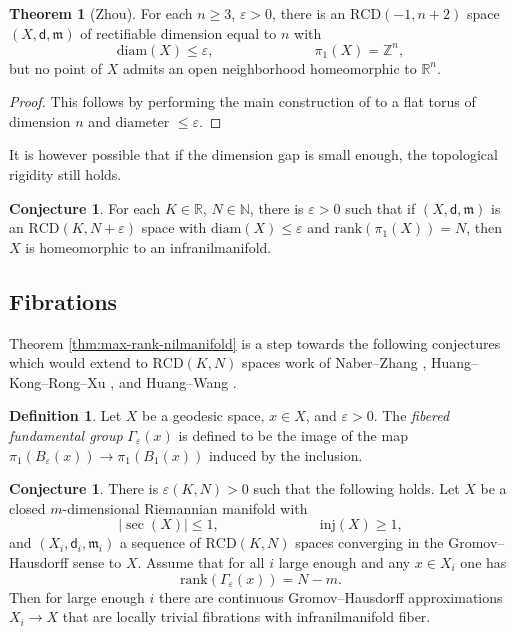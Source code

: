 \documentclass[12pt]{amsart}
\theoremstyle{definition}
\def\fnum{equation}
\newtheorem{theorem}[\fnum]{Theorem}
\newtheorem{conjecture}[\fnum]{Conjecture}
\newtheorem{definition}[\fnum]{Definition}
\numberwithin{equation}{section}
\newcommand{\rank}{{\text{rank}}}
\newcommand{\inj}{{\text{inj}}}
\newcommand{\diam}{{\text {diam}}}
\newcommand{\rcd}{\text{RCD}}
\newcommand{\mm}{\mathfrak{m}}
\newcommand{\Z}{\mathbb{Z}}
\begin{document}
\begin{theorem}[Zhou]
For each $n \geq 3$, $\varepsilon > 0 $, there is an $\rcd (-1, n + 2 )$ space $(X,\mathsf{d}, \mm )$ of rectifiable dimension equal to $n$ with
\[    \diam (X) \leq \varepsilon , \hspace{3cm}  \pi_1(X)= \Z^n,  \] 
but no point of $X$ admits an open neighborhood homeomorphic to $\mathbb{R}^n$. 
\end{theorem} 
    \begin{proof} This follows by performing the main construction of \cite{zhou} to a flat torus of dimension $n$ and diameter $ \leq \varepsilon $.  \end{proof}


It is however possible that if the dimension gap is small enough, the topological rigidity still holds.

\begin{conjecture}
   For each $K \in \mathbb{R}$, $N \in \mathbb{N}$, there is $\varepsilon > 0 $ such that if $(X, \mathsf{d}, \mm )$ is an $\rcd (K, N + \varepsilon )$ space with $ \diam (X) \leq \varepsilon $ and $ \rank (\pi_1(X)) = N $, then $X$ is homeomorphic to an infranilmanifold.
\end{conjecture}




\subsection{Fibrations} Theorem \ref{thm:max-rank-nilmanifold} is a step towards the following conjectures which would extend to $\rcd (K,N)$ spaces work of Naber--Zhang \cite{naber-zhang},   Huang--Kong--Rong--Xu \cite{huang-kong-rong-xu}, and Huang--Wang \cite{huang-wang}.


\begin{definition}
    Let $X$ be a geodesic space, $x \in X$, and $\varepsilon > 0$. The \emph{fibered fundamental group } $\Gamma_{\varepsilon} (x)$ is defined to be the image of the map  $     \pi_1 (B_{\varepsilon}(x)) \to \pi_1(B_1(x))          $ induced by the inclusion. 
\end{definition}

\begin{conjecture}\label{con:wang}
    There is $\varepsilon ( K, N ) > 0 $ such that the following holds. Let $X$ be a closed $m$-dimensional Riemannian manifold with 
    \[     \vert \sec (X) \vert \leq 1 ,\hspace{3cm} \inj (X) \geq 1  ,    \]
    and $(X_i, \mathsf{d}_i, \mm_i )$ a sequence of $\rcd (K,N)$ spaces converging in the Gromov--Hausdorff sense to $X$. Assume that for all $i$ large enough and any $x \in X_i$ one has 
    \[    \rank ( \Gamma _{\varepsilon} (x)) = N - m     .         \]
    Then for large enough $i$ there are continuous Gromov--Hausdorff approximations $X_i \to X$ that are locally trivial fibrations with infranilmanifold fiber.  
\end{conjecture}
\end{document}
